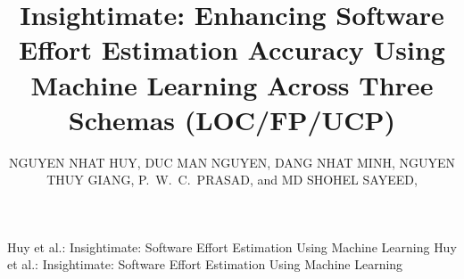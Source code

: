 \documentclass{ieeeaccess}
\begin{document}

\title{Insightimate: Enhancing Software Effort Estimation Accuracy Using Machine Learning Across Three Schemas (LOC/FP/UCP)}

\author{\uppercase{Nguyen Nhat Huy}, \uppercase{Duc Man Nguyen},
\uppercase{Dang Nhat Minh}, \uppercase{Nguyen Thuy Giang},
\uppercase{P.~W.~C.~Prasad}, and \uppercase{Md Shohel Sayeed},
}

\address[1]{International School, Duy Tan University, Da Nang 550000, Vietnam
(e-mail: nhathuycntt@gmail.com)}
\address[2]{Faculty of Information Science and Technology, Multimedia University, Malaysia
(e-mail: shohel.sayeed@mmu.edu.my)}


\markboth
{Huy et al.: Insightimate: Software Effort Estimation Using Machine Learning}
{Huy et al.: Insightimate: Software Effort Estimation Using Machine Learning}
\end{document}

